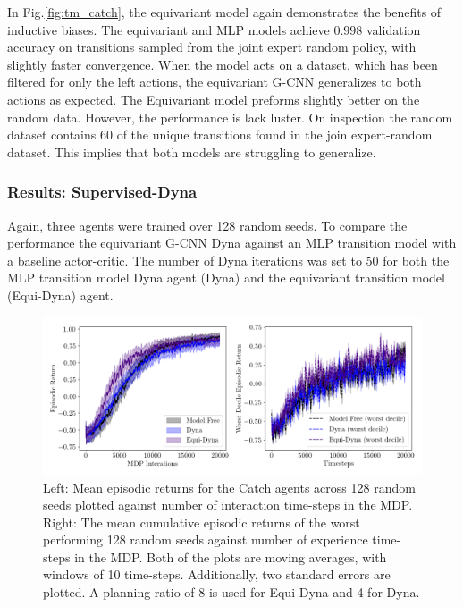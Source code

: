 In Fig.\ref{fig:tm_catch}, the equivariant model again demonstrates the benefits of inductive biases. The equivariant and MLP models achieve $0.998$ validation accuracy on transitions sampled from the joint expert random policy, with slightly faster convergence. When the model acts on a dataset, which has been filtered for only the left actions, the equivariant G-CNN generalizes to both actions as expected. The Equivariant model preforms slightly better on the random data. However, the performance is lack luster. On inspection the random dataset contains $60$ of the unique transitions found in the join expert-random dataset. This implies that both models are struggling to generalize.

\subsubsection{Results: Supervised-Dyna}
Again, three agents were trained over 128 random seeds. To compare the performance the equivariant G-CNN Dyna against an MLP transition model with a baseline actor-critic. The number of Dyna iterations was set to 50 for both the MLP transition model Dyna agent (Dyna) and the equivariant transition model (Equi-Dyna) agent.

\begin{figure}
	\centering
	\includegraphics[width=\textwidth]{Figures/Expert_dyna_catch_best.png}
	\caption{Left: Mean episodic returns for the Catch agents across 128 random seeds
		plotted against number of interaction time-steps in the MDP. Right: The mean
		cumulative episodic returns of the worst performing 128 random seeds against
		number of experience time-steps in the MDP. Both of the plots are moving
		averages, with windows of 10 time-steps. Additionally, two standard errors are
		plotted. A planning ratio of 8 is used for Equi-Dyna and 4 for Dyna.}
	\label{fig:Supervised-Dyna-catch}
\end{figure}

